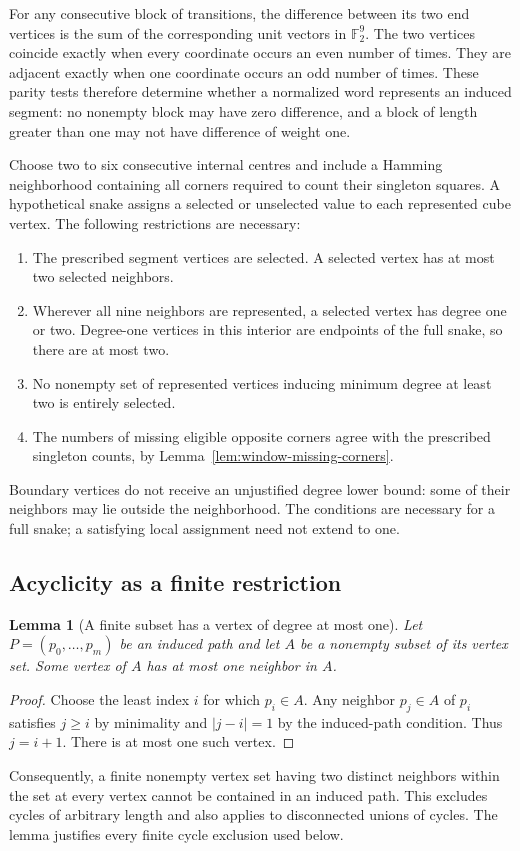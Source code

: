 \documentclass[11pt,a4paper]{article}
\newtheorem{lemma}[theorem]{Lemma}
\theoremstyle{definition}
\theoremstyle{remark}
\begin{document}
For any consecutive block of transitions, the difference between its two end vertices is the sum of the corresponding unit vectors in $\mathbb F_2^9$. The two vertices coincide exactly when every coordinate occurs an even number of times. They are adjacent exactly when one coordinate occurs an odd number of times. These parity tests therefore determine whether a normalized word represents an induced segment: no nonempty block may have zero difference, and a block of length greater than one may not have difference of weight one.

Choose two to six consecutive internal centres and include a Hamming neighborhood containing all corners required to count their singleton squares. A hypothetical snake assigns a selected or unselected value to each represented cube vertex. The following restrictions are necessary:
\begin{enumerate}
\item The prescribed segment vertices are selected. A selected vertex has at most two selected neighbors.
\item Wherever all nine neighbors are represented, a selected vertex has degree one or two. Degree-one vertices in this interior are endpoints of the full snake, so there are at most two.
\item No nonempty set of represented vertices inducing minimum degree at least two is entirely selected.
\item The numbers of missing eligible opposite corners agree with the prescribed singleton counts, by Lemma~\ref{lem:window-missing-corners}.
\end{enumerate}
Boundary vertices do not receive an unjustified degree lower bound: some of their neighbors may lie outside the neighborhood. The conditions are necessary for a full snake; a satisfying local assignment need not extend to one.

\subsection{Acyclicity as a finite restriction}
\begin{lemma}[A finite subset has a vertex of degree at most one]\label{lem:subset-low-degree}
Let $P=(p_0,\ldots,p_m)$ be an induced path and let $A$ be a nonempty subset of its vertex set. Some vertex of $A$ has at most one neighbor in $A$.
\end{lemma}
\begin{proof}
Choose the least index $i$ for which $p_i\in A$. Any neighbor $p_j\in A$ of $p_i$ satisfies $j\ge i$ by minimality and $|j-i|=1$ by the induced-path condition. Thus $j=i+1$. There is at most one such vertex.
\end{proof}
Consequently, a finite nonempty vertex set having two distinct neighbors within the set at every vertex cannot be contained in an induced path. This excludes cycles of arbitrary length and also applies to disconnected unions of cycles. The lemma justifies every finite cycle exclusion used below.
\end{document}
